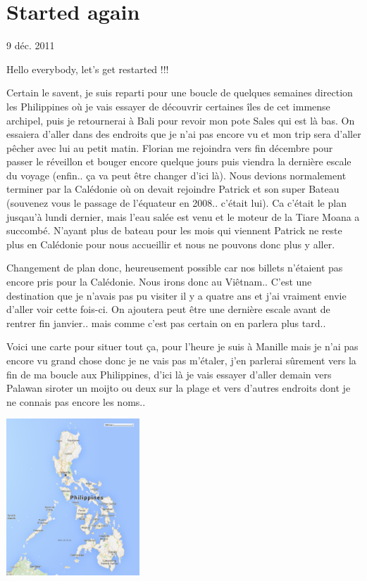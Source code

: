 \section{Started again}

9 déc. 2011

\begin{multicols}{2}

Hello everybody, let's get restarted !!!

Certain le savent, je suis reparti pour une boucle de quelques semaines direction les Philippines où je vais essayer de découvrir certaines îles de cet immense archipel, puis je retournerai à Bali pour revoir mon pote Sales qui est là bas. On essaiera d'aller dans des endroits que je n'ai pas encore vu et mon trip sera d'aller pêcher avec lui au petit matin. Florian me rejoindra vers fin décembre pour passer le réveillon et bouger encore quelque jours puis viendra la dernière escale du voyage (enfin.. ça va peut être changer d'ici là). Nous devions normalement terminer par la Calédonie où on devait rejoindre Patrick et son super Bateau (souvenez vous le passage de l'équateur en 2008.. c'était lui). Ca c'était le plan jusqau'à lundi dernier, mais l'eau salée est venu et le moteur de la Tiare Moana a succombé. N'ayant plus de bateau pour les mois qui viennent Patrick ne reste plus en Calédonie pour nous accueillir et nous ne pouvons donc plus y aller.

Changement de plan donc, heureusement possible car nos billets n'étaient pas encore pris pour la Calédonie. Nous irons donc au Viêtnam.. C'est une destination que je n'avais pas pu visiter il y a quatre ans et j'ai vraiment envie d'aller voir cette fois-ci. On ajoutera peut être une dernière escale avant de rentrer fin janvier.. mais comme c'est pas certain on en parlera plus tard..

Voici une carte pour situer tout ça, pour l'heure je suis à Manille mais je n'ai pas encore vu grand chose donc je ne vais pas m'étaler, j'en parlerai sûrement vers la fin de ma boucle aux Philippines, d'ici là je vais essayer d'aller demain vers Palawan siroter un moijto ou deux sur la plage et vers d'autres endroits dont je ne connais pas encore les noms..

\smallbreak
\hspace*{-0.65cm}
\includegraphics[width=5cm]{articles/Started-again/philippines.png}
\smallbreak


\end{multicols}
